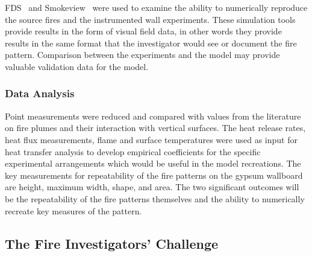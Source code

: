 \documentclass[twoside]{uocthesis}
\begin{document}
{FDS~\cite{McGrattan:2014} and Smokeview~\cite{Forney:2014} were used to examine the ability to numerically reproduce the source fires and the instrumented wall experiments. These simulation tools provide results in the form of visual field data, in other words they provide results in the same format that the investigator would see or document the fire pattern.  Comparison between the experiments and the model may provide valuable validation data for the model.

\subsubsection{Data Analysis}

Point measurements were reduced and compared with values from the literature on fire plumes and their interaction with vertical surfaces.  The heat release rates, heat flux measurements, flame and surface temperatures were used as input for heat transfer analysis to develop empirical coefficients for the specific experimental arrangements which would be useful in the model recreations.
The key measurements for repeatability of the fire patterns on the gypsum wallboard are height, maximum width, shape, and area.  The two significant outcomes will be the repeatability of the fire patterns themselves and the ability to numerically recreate key measures of the pattern.

\subsection{The Fire Investigators' Challenge}

}
\end{document}
